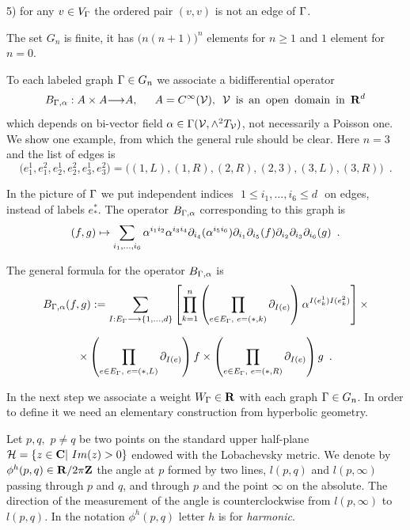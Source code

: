        5) for any $v\in V_{\Gamma}$ the ordered pair
         $(v,v)$ is not  an edge of ${\Gamma}$.
         
      
       The 
        set $G_n$ is finite, it has 
       $\bigl(n(n+1)\bigr)^n$ elements for $n\ge 1$ and $1$ element
 for $n=0$.
       
       To each labeled graph ${\Gamma}\in G_n$ 
         we associate a bidifferential
        operator 
        $$B_{{\Gamma},{\alpha}}:A\times A{\longrightarrow} A,\,\,\,\,\,
        \,\,\,\,A=C^{\infty}({\cal V}),\,\,\,{\cal V}{\rm
        \,\,\,is\,\,\,an\,\,\,open\,\,\,domain\,\,\,in\,\,\,}{\bf R}^d$$ 
         which depends  on 
         bi-vector field ${\alpha}\in {\Gamma}({\cal V},\wedge^2 T_{{\cal V}})$, not necessarily a 
         Poisson one. 
        We show one 
        example, from which the general rule should be clear.
         Here $n=3$ and the list of edges is 
         $$
         \bigl(e_1^1,e_1^2,e_2^1,e_2^2,e_3^1,e_3^2\bigr)=
         \bigl((1,L),(1,R),(2,R),(2,3),(3,L),(3,R)\bigr)\,\,\,.$$
         
          \vskip 1cm 
         \centerline{}
       \vskip 11mm

         In the picture of ${\Gamma}$ we put independent indices
          $\,\,1\le i_1,\dots,i_6\le d\,\,$ on edges,
           instead of labels $e_*^*$. 
         The operator $B_{{\Gamma},{\alpha}}$ corresponding to this graph is
         $$(f,g)\mapsto \sum_{i_1,\dots, i_6} 
       {\alpha}^{i_1 i_2} {\alpha}^{i_3 i_4} {\partial}_{i_4}({\alpha}^{i_5 i_6})
       {\partial}_{i_1} {\partial}_{i_5} (f) {\partial}_{i_2}{\partial}_{i_3}{\partial}_{i_6}(g)\,\,\,.$$
       
       The general formula for the operator $B_{{\Gamma},{\alpha}}$ is
       $$B_{{\Gamma},{\alpha}}(f,g):=\sum_{
I:E_{\Gamma}{\longrightarrow} \{1,\dots,d\}}\left[
 \prod_{k=1}^n \left(\prod_{e\in E_{\Gamma},\,\,e=(*,k)}{\partial}_{I(e)}\right)
 {\alpha}^{I(e_k^1)I(e_k^2)}\right]\times$$
 
  $$\times \left(\prod_{ e\in E_{\Gamma},\,\,e=(*,L)} {\partial}_{I(e)}\right)f\times
  \left(\prod_{e\in E_{\Gamma},\,\,e=(*,R)} {\partial}_{I(e)}\right)g\,\,\,.$$
       
       
       
       
       In the next step we associate a weight 
       $W_{{\Gamma}}\in {\bf R}$ with each graph ${\Gamma}\in G_n$.
        In order to define it we  need an elementary construction 
        from hyperbolic geometry. 
        
        Let $p,q,\,\,p\ne q$ be two points
         on the standard upper half-plane $ {\cal H}=\{z\in {\bf C}|\,\,Im(z)>0\}$
       endowed with the Lobachevsky metric. We denote by
         $\phi^{h}(p,q)\in {\bf R}/2\pi {\bf Z}$ the angle at $p$ formed by 
         two  
         lines, $l(p,q)$ and $l(p, \infty)$ passing through $p$ 
         and $q$, and
         through $p$ and the point $\infty$ on the absolute. The direction
          of the measurement of the angle is counterclockwise from
           $l(p,\infty)$ to $l(p,q)$. In the notation $\phi^h (p,q)$
            letter $h$ is
            for {\it harmonic}.
            

